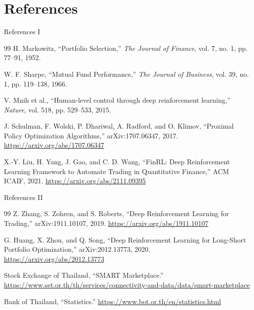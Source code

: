 \documentclass[aspectratio=43,10pt]{beamer}
\begin{document}
\section{References}

\begin{frame}{References I}
\scriptsize
\begin{thebibliography}{99}
H. Markowitz, ``Portfolio Selection,'' \textit{The Journal of Finance}, vol. 7, no. 1, pp. 77--91, 1952.

W. F. Sharpe, ``Mutual Fund Performance,'' \textit{The Journal of Business}, vol. 39, no. 1, pp. 119--138, 1966.

V. Mnih et al., ``Human-level control through deep reinforcement learning,'' \textit{Nature}, vol. 518, pp. 529--533, 2015.

J. Schulman, F. Wolski, P. Dhariwal, A. Radford, and O. Klimov, ``Proximal Policy Optimization Algorithms,'' arXiv:1707.06347, 2017. \url{https://arxiv.org/abs/1707.06347}

X.-Y. Liu, H. Yang, J. Gao, and C. D. Wang, ``FinRL: Deep Reinforcement Learning Framework to Automate Trading in Quantitative Finance,'' ACM ICAIF, 2021. \url{https://arxiv.org/abs/2111.09395}
\end{thebibliography}
\end{frame}

\begin{frame}{References II}
\scriptsize
\begin{thebibliography}{99}
Z. Zhang, S. Zohren, and S. Roberts, ``Deep Reinforcement Learning for Trading,'' arXiv:1911.10107, 2019. \url{https://arxiv.org/abs/1911.10107}

G. Huang, X. Zhou, and Q. Song, ``Deep Reinforcement Learning for Long-Short Portfolio Optimization,'' arXiv:2012.13773, 2020. \url{https://arxiv.org/abs/2012.13773}

Stock Exchange of Thailand, ``SMART Marketplace.'' \url{https://www.set.or.th/th/services/connectivity-and-data/data/smart-marketplace}

Bank of Thailand, ``Statistics.'' \url{https://www.bot.or.th/en/statistics.html}
\end{thebibliography}
\end{frame}
\end{document}
